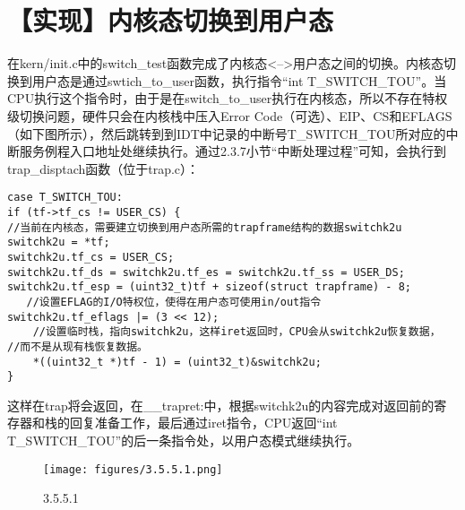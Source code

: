 \section{【实现】内核态切换到用户态}\label{ux5b9eux73b0ux5185ux6838ux6001ux5207ux6362ux5230ux7528ux6237ux6001}

在kern/init.c中的switch\_test函数完成了内核态\textless{}--\textgreater{}用户态之间的切换。内核态切换到用户态是通过swtich\_to\_user函数，执行指令``int
T\_SWITCH\_TOU''。当CPU执行这个指令时，由于是在switch\_to\_user执行在内核态，所以不存在特权级切换问题，硬件只会在内核栈中压入Error
Code（可选）、EIP、CS和EFLAGS（如下图所示），然后跳转到到IDT中记录的中断号T\_SWITCH\_TOU所对应的中断服务例程入口地址处继续执行。通过2.3.7小节``中断处理过程''可知，会执行到trap\_disptach函数（位于trap.c）：

\begin{lstlisting}
case T_SWITCH_TOU:
if (tf->tf_cs != USER_CS) {
//当前在内核态，需要建立切换到用户态所需的trapframe结构的数据switchk2u
switchk2u = *tf;
switchk2u.tf_cs = USER_CS;
switchk2u.tf_ds = switchk2u.tf_es = switchk2u.tf_ss = USER_DS;
switchk2u.tf_esp = (uint32_t)tf + sizeof(struct trapframe) - 8;
   //设置EFLAG的I/O特权位，使得在用户态可使用in/out指令
switchk2u.tf_eflags |= (3 << 12);
    //设置临时栈，指向switchk2u，这样iret返回时，CPU会从switchk2u恢复数据，
//而不是从现有栈恢复数据。
    *((uint32_t *)tf - 1) = (uint32_t)&switchk2u;
}
\end{lstlisting}

这样在trap将会返回，在\_\_trapret:中，根据switchk2u的内容完成对返回前的寄存器和栈的回复准备工作，最后通过iret指令，CPU返回``int
T\_SWITCH\_TOU''的后一条指令处，以用户态模式继续执行。

\begin{figure}[htbp]
\centering
\texttt{[image: figures/3.5.5.1.png]}
\caption{3.5.5.1}
\end{figure}
